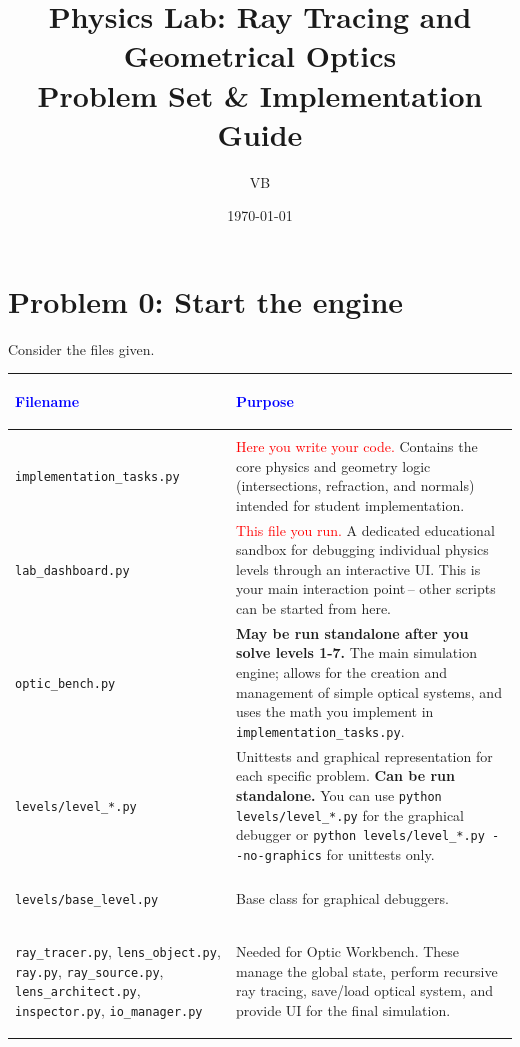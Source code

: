 \documentclass[11pt]{article}
\title{Physics Lab: Ray Tracing and Geometrical Optics \\ \large Problem Set \& Implementation Guide}
\author{VB}
\date{\today}
\begin{document}
\maketitle

\section*{Problem 0: Start the engine}

Consider the files given.
\begin{center}
\renewcommand{\arraystretch}{1.5}
\begin{tabularx}{\textwidth}{@{} >{\bfseries\raggedright\arraybackslash}p{5.5cm} X @{}}
\toprule
\textcolor{blue}{Filename} & \textcolor{blue}{Purpose} \\ \midrule
\multicolumn{2}{@{}l}{\textbf{Direct Interaction}} \\ \midrule
\lstinline|implementation_tasks.py| & \textcolor{red}{Here you write your code.} Contains the core physics and geometry logic (intersections, refraction, and normals) intended for student implementation. \\
\lstinline|lab_dashboard.py| & \textcolor{red}{This file you run.} A dedicated educational sandbox for debugging individual physics levels through an interactive UI. This is your main interaction point\,-- other scripts can be started from here.\\
\lstinline|optic_bench.py| & \textbf{May be run standalone after you solve levels 1-7.} The main simulation engine; allows for the creation and management of simple optical systems, and uses the math you implement in \lstinline|implementation_tasks.py|. \\
\lstinline|levels/level_*.py| & Unittests and graphical representation for each specific problem. \textbf{Can be run standalone.} You can use \lstinline|python levels/level_*.py| for the graphical debugger or \lstinline|python levels/level_*.py --no-graphics| for unittests only. \\ \midrule
\multicolumn{2}{@{}l}{\textbf{Under the Hood}} \\ \midrule
\lstinline|levels/base_level.py| & Base class for graphical debuggers.\\
\mbox{\lstinline|ray_tracer.py|}, \mbox{\lstinline|lens_object.py|}, \mbox{\lstinline|ray.py|}, \mbox{\lstinline|ray_source.py|}, \mbox{\lstinline|lens_architect.py|}, \mbox{\lstinline|inspector.py|}, \mbox{\lstinline|io_manager.py|} & Needed for Optic Workbench. These manage the global state, perform recursive ray tracing, save/load optical system, and provide UI for the final simulation. \\
\bottomrule
\end{tabularx}
\end{center}
\end{document}
